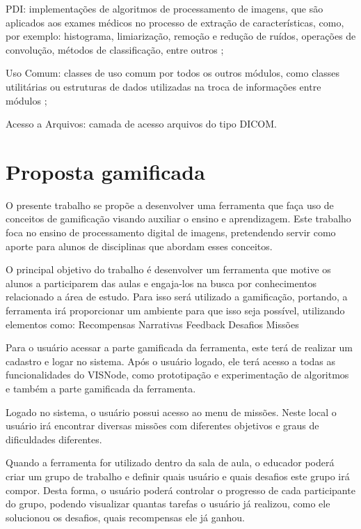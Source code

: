 \documentclass[
	12pt,				%
	oneside,			%
	a4paper,			%
	english,			%
	french,				%
	spanish,			%
	brazil,				%
	]{abntex2}
\begin{document}
PDI: implementações de algoritmos de processamento de imagens, que são aplicados aos exames médicos no processo de extração de características, como, por exemplo: histograma, limiarização, remoção e redução de ruídos, operações de convolução, métodos de classificação, entre outros \cite{reisferramenta}; 

Uso Comum: classes de uso  comum  por todos os outros módulos, como classes utilitárias ou estruturas de dados utilizadas na troca de informações entre módulos \cite{reisferramenta}; 

Acesso a Arquivos: camada de acesso arquivos do tipo DICOM\cite{reisferramenta}.

\section{Proposta gamificada}

O presente trabalho se propõe a desenvolver uma ferramenta que faça uso de conceitos de gamificação visando auxiliar o ensino e aprendizagem. Este trabalho foca no ensino de processamento digital de imagens, pretendendo servir como aporte para alunos de disciplinas que abordam esses conceitos.

O principal objetivo do trabalho é desenvolver um ferramenta que motive os alunos a participarem das aulas e engaja-los na busca por conhecimentos relacionado a área de estudo. Para isso será utilizado a gamificação, portando, a ferramenta irá proporcionar um ambiente para que isso seja possível, utilizando elementos como:
Recompensas
Narrativas
Feedback
Desafios
Missões

Para o usuário acessar a parte gamificada da ferramenta, este terá de realizar um cadastro e logar no sistema. Após o usuário logado, ele terá acesso a todas as funcionalidades do VISNode, como prototipação e experimentação de algoritmos e também a parte gamificada da ferramenta.

Logado no sistema, o usuário possui acesso ao menu de missões. Neste local o usuário irá encontrar diversas missões com diferentes objetivos e graus de dificuldades diferentes.	

Quando a ferramenta for utilizado dentro da sala de aula, o educador poderá criar um grupo de trabalho e definir quais usuário e quais desafios este grupo irá compor. Desta forma, o usuário poderá controlar o progresso de cada participante do grupo, podendo visualizar quantas tarefas o usuário já realizou, como ele solucionou os desafios, quais recompensas ele já ganhou.
\end{document}
